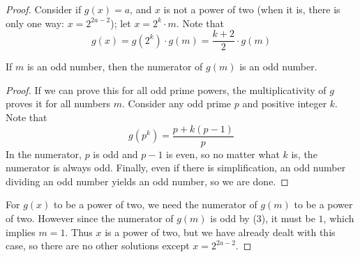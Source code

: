 \begin{solution}
\begin{enumerate}[(a)]
\begin{proof}
        Consider if $g(x) = a$, and $x$ is not a power of two (when it is, there is only one way: $x = 2^{2a-2}$); let $x = 2^k \cdot m$. Note that \[g(x) = g(2^k) \cdot g(m) = \frac{k+2}{2} \cdot g(m)\]
        
        \begin{claim*}[3]
        If $m$ is an odd number, then the numerator of $g(m)$ is an odd number.
        \end{claim*}
        \begin{proof}
        If we can prove this for all odd prime powers, the multiplicativity of $g$ proves it for all numbers $m$. Consider any odd prime $p$ and positive integer $k$. Note that \[g(p^k) = \frac{p + k(p-1)}{p}\] In the numerator, $p$ is odd and $p-1$ is even, so no matter what $k$ is, the numerator is always odd. Finally, even if there is simplification, an odd number dividing an odd number yields an odd number, so we are done.
        \end{proof}
        
        For $g(x)$ to be a power of two, we need the numerator of $g(m)$ to be a power of two. However since the numerator of $g(m)$ is odd by (3), it must be $1$, which implies $m = 1$. Thus $x$ is a power of two, but we have already dealt with this case, so there are no other solutions except $x = 2^{2a-2}$.
        \end{proof}
    \end{enumerate}
\end{solution}

